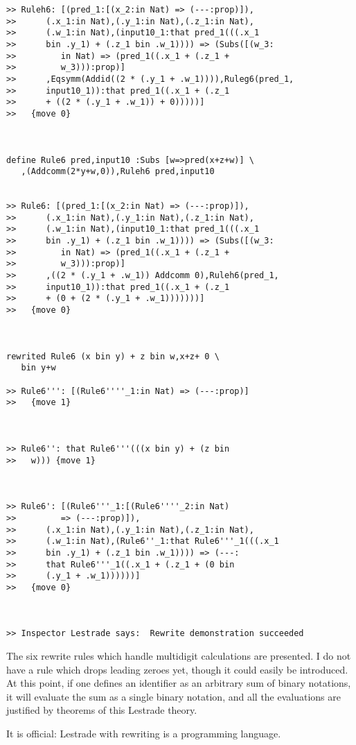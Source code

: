 \documentclass{article}
\begin{document}
\begin{verbatim}
>> Ruleh6: [(pred_1:[(x_2:in Nat) => (---:prop)]),
>>      (.x_1:in Nat),(.y_1:in Nat),(.z_1:in Nat),
>>      (.w_1:in Nat),(input10_1:that pred_1(((.x_1
>>      bin .y_1) + (.z_1 bin .w_1)))) => (Subs([(w_3:
>>         in Nat) => (pred_1((.x_1 + (.z_1 +
>>         w_3))):prop)]
>>      ,Eqsymm(Addid((2 * (.y_1 + .w_1)))),Ruleg6(pred_1,
>>      input10_1)):that pred_1((.x_1 + (.z_1
>>      + ((2 * (.y_1 + .w_1)) + 0)))))]
>>   {move 0}



define Rule6 pred,input10 :Subs [w=>pred(x+z+w)] \
   ,(Addcomm(2*y+w,0)),Ruleh6 pred,input10


>> Rule6: [(pred_1:[(x_2:in Nat) => (---:prop)]),
>>      (.x_1:in Nat),(.y_1:in Nat),(.z_1:in Nat),
>>      (.w_1:in Nat),(input10_1:that pred_1(((.x_1
>>      bin .y_1) + (.z_1 bin .w_1)))) => (Subs([(w_3:
>>         in Nat) => (pred_1((.x_1 + (.z_1 +
>>         w_3))):prop)]
>>      ,((2 * (.y_1 + .w_1)) Addcomm 0),Ruleh6(pred_1,
>>      input10_1)):that pred_1((.x_1 + (.z_1
>>      + (0 + (2 * (.y_1 + .w_1)))))))]
>>   {move 0}



rewrited Rule6 (x bin y) + z bin w,x+z+ 0 \
   bin y+w

>> Rule6''': [(Rule6''''_1:in Nat) => (---:prop)]
>>   {move 1}



>> Rule6'': that Rule6'''(((x bin y) + (z bin
>>   w))) {move 1}



>> Rule6': [(Rule6'''_1:[(Rule6''''_2:in Nat)
>>         => (---:prop)]),
>>      (.x_1:in Nat),(.y_1:in Nat),(.z_1:in Nat),
>>      (.w_1:in Nat),(Rule6''_1:that Rule6'''_1(((.x_1
>>      bin .y_1) + (.z_1 bin .w_1)))) => (---:
>>      that Rule6'''_1((.x_1 + (.z_1 + (0 bin
>>      (.y_1 + .w_1))))))]
>>   {move 0}



>> Inspector Lestrade says:  Rewrite demonstration succeeded

\end{verbatim}

The six rewrite rules which handle multidigit calculations are presented.  I do not have a rule which drops leading zeroes yet, though it could easily be introduced.  At this point, if one defines an identifier as an arbitrary sum of binary notations, it will evaluate the sum as a single binary notation, and all the evaluations are justified by theorems of this Lestrade theory.

It is official:  Lestrade with rewriting is a programming language.
\end{document}
